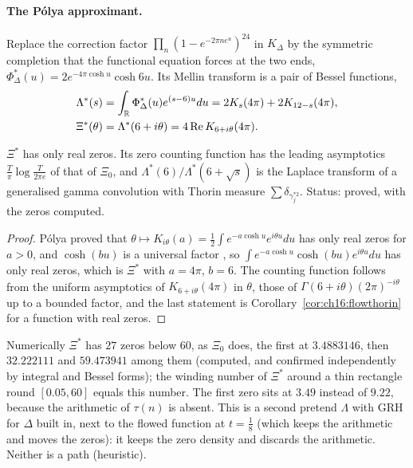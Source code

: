 \paragraph{The P\'olya approximant.} Replace the correction factor $\prod_n(1-e^{-2\pi ne^u})^{24}$ in $K_\Delta$ by the symmetric completion that the functional equation forces at the two ends, $\Phi^*_\Delta(u)=2e^{-4\pi\cosh u}\cosh6u$. Its Mellin transform is a pair of Bessel functions,
\begin{equation}\label{eq:ch16:polya}
\begin{split}
\Lambda^*(s)&=\int_{\mathbb R}\Phi^*_\Delta(u)e^{(s-6)u}du=2K_s(4\pi)+2K_{12-s}(4\pi),\\
\Xi^*(\theta)&=\Lambda^*(6+i\theta)=4\operatorname{Re} K_{6+i\theta}(4\pi).
\end{split}
\end{equation}

\begin{proposition}\label{prop:ch16:polya}
$\Xi^*$ has only real zeros. Its zero counting function has the leading asymptotics $\frac T\pi\log\frac T{2\pi e}$ of that of $\Xi_0$, and $\Lambda^*(6)/\Lambda^*(6+\sqrt s)$ is the Laplace transform of a generalised gamma convolution with Thorin measure $\sum\delta_{\gamma_j^{*2}}$. Status: proved, with the zeros computed.
\end{proposition}

\begin{proof}
P\'olya \cite{Polya} proved that $\theta\mapsto K_{i\theta}(a)=\frac12\int e^{-a\cosh u}e^{i\theta u}du$ has only real zeros for $a>0$, and $\cosh(bu)$ is a universal factor \cite[p.~197]{deBruijn}, so $\int e^{-a\cosh u}\cosh(bu)e^{i\theta u}du$ has only real zeros, which is $\Xi^*$ with $a=4\pi$, $b=6$. The counting function follows from the uniform asymptotics of $K_{6+i\theta}(4\pi)$ in $\theta$, those of $\Gamma(6+i\theta)(2\pi)^{-i\theta}$ up to a bounded factor, and the last statement is Corollary~\ref{cor:ch16:flowthorin} for a function with real zeros.
\end{proof}

Numerically $\Xi^*$ has $27$ zeros below $60$, as $\Xi_0$ does, the first at $3.4883146$, then $32.222111$ and $59.473941$ among them (computed, and confirmed independently by integral and Bessel forms); the winding number of $\Xi^*$ around a thin rectangle round $[0.05,60]$ equals this number. The first zero sits at $3.49$ instead of $9.22$, because the arithmetic of $\tau(n)$ is absent. This is a second pretend $\Lambda$ with GRH for $\Delta$ built in, next to the flowed function at $t=\frac18$ (which keeps the arithmetic and moves the zeros): it keeps the zero density and discards the arithmetic. Neither is a path (heuristic).

